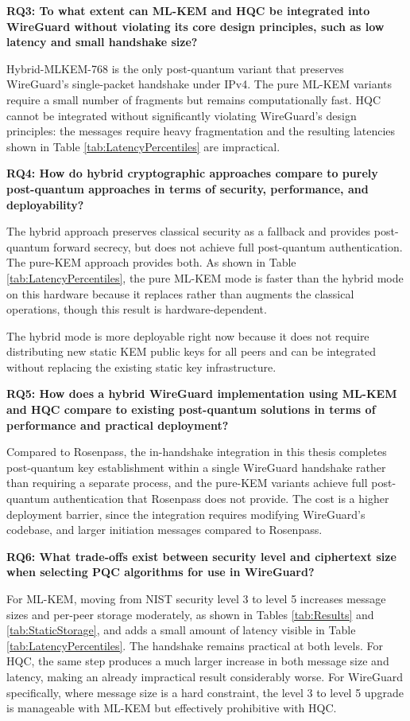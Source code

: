 \textbf{RQ3: To what extent can ML-KEM and HQC be integrated into WireGuard without violating its core design principles, such as low latency and small handshake size?}

Hybrid-MLKEM-768 is the only post-quantum variant that preserves WireGuard's single-packet handshake under IPv4. The pure ML-KEM variants require a small number of fragments but remains computationally fast. HQC cannot be integrated without significantly violating WireGuard's design principles: the messages require heavy fragmentation and the resulting latencies shown in Table \ref{tab:LatencyPercentiles} are impractical. 

\textbf{RQ4: How do hybrid cryptographic approaches compare to purely post-quantum approaches in terms of security, performance, and deployability?}

The hybrid approach preserves classical security as a fallback and provides post-quantum forward secrecy, but does not achieve full post-quantum authentication. The pure-KEM approach provides both. As shown in Table \ref{tab:LatencyPercentiles}, the pure ML-KEM mode is faster than the hybrid mode on this hardware because it replaces rather than augments the classical operations, though this result is hardware-dependent. 

The hybrid mode is more deployable right now because it does not require distributing new static KEM public keys for all peers and can be integrated without replacing the existing static key infrastructure.

\textbf{RQ5: How does a hybrid WireGuard implementation using ML-KEM and HQC compare to existing post-quantum solutions in terms of performance and practical deployment?}

Compared to Rosenpass, the in-handshake integration in this thesis completes post-quantum key establishment within a single WireGuard handshake rather than requiring a separate process, and the pure-KEM variants achieve full post-quantum authentication that Rosenpass does not provide. The cost is a higher deployment barrier, since the integration requires modifying WireGuard's codebase, and larger initiation messages compared to Rosenpass.

\textbf{RQ6: What trade-offs exist between security level and ciphertext size when selecting PQC algorithms for use in WireGuard?}

For ML-KEM, moving from NIST security level 3 to level 5 increases message sizes and per-peer storage moderately, as shown in Tables \ref{tab:Results} and \ref{tab:StaticStorage}, and adds a small amount of latency visible in Table \ref{tab:LatencyPercentiles}. The handshake remains practical at both levels. For HQC, the same step produces a much larger increase in both message size and latency, making an already impractical result considerably worse. For WireGuard specifically, where message size is a hard constraint, the level 3 to level 5 upgrade is manageable with ML-KEM but effectively prohibitive with HQC.